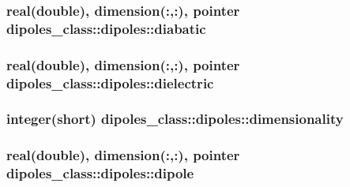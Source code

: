 \hypertarget{structdipoles__class_1_1dipoles_acb589f5c8c60337abc5da4b268ccd0e8}{
\subsubsection[{diabatic}]{\setlength{\rightskip}{0pt plus 5cm}real(double), dimension(\-:,\-:), pointer dipoles\-\_\-class\-::dipoles\-::diabatic\hspace{0.3cm}{\ttfamily [private]}}}\label{structdipoles__class_1_1dipoles_acb589f5c8c60337abc5da4b268ccd0e8}
\hypertarget{structdipoles__class_1_1dipoles_a669f75c4c95efa1ea721ba8aa7f785d3}{
\subsubsection[{dielectric}]{\setlength{\rightskip}{0pt plus 5cm}real(double), dimension(\-:,\-:), pointer dipoles\-\_\-class\-::dipoles\-::dielectric\hspace{0.3cm}{\ttfamily [private]}}}\label{structdipoles__class_1_1dipoles_a669f75c4c95efa1ea721ba8aa7f785d3}
\hypertarget{structdipoles__class_1_1dipoles_ae809ff43be02c6f93cd5a6010368a246}{
\subsubsection[{dimensionality}]{\setlength{\rightskip}{0pt plus 5cm}integer(short) dipoles\-\_\-class\-::dipoles\-::dimensionality\hspace{0.3cm}{\ttfamily [private]}}}\label{structdipoles__class_1_1dipoles_ae809ff43be02c6f93cd5a6010368a246}
\hypertarget{structdipoles__class_1_1dipoles_a6786ac3377ec10046d5a7bacf0b14da1}{
\subsubsection[{dipole}]{\setlength{\rightskip}{0pt plus 5cm}real(double), dimension(\-:,\-:), pointer dipoles\-\_\-class\-::dipoles\-::dipole\hspace{0.3cm}{\ttfamily [private]}}}\label{structdipoles__class_1_1dipoles_a6786ac3377ec10046d5a7bacf0b14da1}

